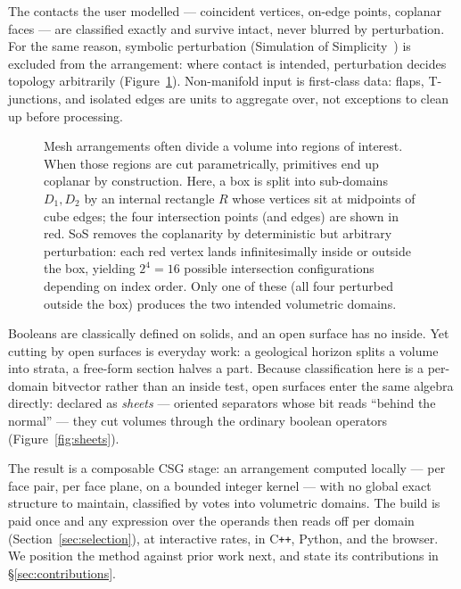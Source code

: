 \documentclass{egpubl}
\begin{document}
The contacts the user modelled --- coincident vertices, on-edge points, coplanar faces --- are classified exactly and survive intact, never blurred by perturbation. For the same reason, symbolic perturbation (Simulation of Simplicity~\cite{EdelsbrunnerMucke1990}) is excluded from the arrangement: where contact is intended, perturbation decides topology arbitrarily (Figure~\ref{fig:sos_box_divider}). Non-manifold input is first-class data: flaps, T-junctions, and isolated edges are units to aggregate over, not exceptions to clean up before processing.

\begin{figure}[t]
  \centering
  
  \caption{Mesh arrangements often divide a volume into regions of interest. When those regions are cut parametrically, primitives end up coplanar by construction. Here, a box is split into sub-domains $D_1, D_2$ by an internal rectangle $R$ whose vertices sit at midpoints of cube edges; the four intersection points (and edges) are shown in red. SoS removes the coplanarity by deterministic but arbitrary perturbation: each red vertex lands infinitesimally inside or outside the box, yielding $2^4 = 16$ possible intersection configurations depending on index order. Only one of these (all four perturbed outside the box) produces the two intended volumetric domains.}
  \label{fig:sos_box_divider}
\end{figure}

Booleans are classically defined on solids, and an open surface has no inside. Yet cutting by open surfaces is everyday work: a geological horizon splits a volume into strata, a free-form section halves a part. Because classification here is a per-domain bitvector rather than an inside test, open surfaces enter the same algebra directly: declared as \emph{sheets} --- oriented separators whose bit reads ``behind the normal'' --- they cut volumes through the ordinary boolean operators (Figure~\ref{fig:sheets}).

The result is a composable CSG stage: an arrangement computed locally --- per face pair, per face plane, on a bounded integer kernel --- with no global exact structure to maintain, classified by votes into volumetric domains. The build is paid once and any expression over the operands then reads off per domain (Section~\ref{sec:selection}), at interactive rates, in C\texttt{++}, Python, and the browser. We position the method against prior work next, and state its contributions in \S\ref{sec:contributions}.
\end{document}
